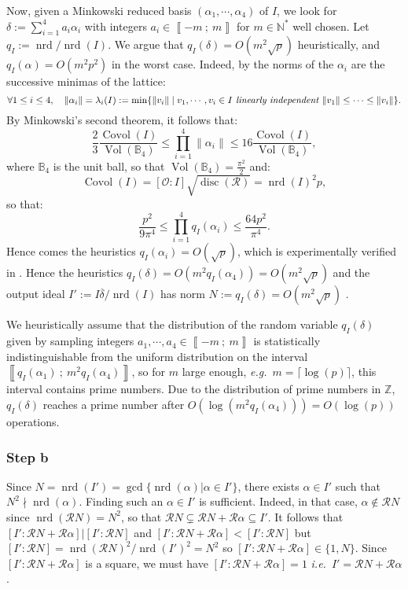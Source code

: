 \documentclass[a4paper,10pt]{report}
\theoremstyle{definition}
\theoremstyle{plain}
\theoremstyle{definition}
\newcommand{\ie}{\emph{i.e.}\ }
\newcommand{\eg}{\emph{e.g.}\ }
\newcommand{\N}{\mathbb{N}}
\newcommand{\Z}{\mathbb{Z}}
\newcommand{\B}{\mathbb{B}}
\newcommand{\m}[1]{\mathcal{#1}}
\newcommand{\mO}{\mathcal{O}}
\renewcommand{\i}[2]{\left\llbracket #1~;~#2\right\rrbracket}
\renewcommand{\(}{\left(}
\renewcommand{\)}{\right)}
\DeclareMathOperator{\disc}{disc}
\DeclareMathOperator{\nrd}{nrd}
\DeclareMathOperator{\Vol}{Vol}
\DeclareMathOperator{\Covol}{Covol}
\begin{document}
Now, given a Minkowski reduced basis $(\alpha_1, \cdots, \alpha_4)$ of $I$, we look for $\delta:=\sum_{i=1}^4 a_i\alpha_i$ with integers $a_i\in\i{-m}{m}$ for $m\in\N^*$ well chosen.  Let $q_I:=\nrd/\nrd(I)$. We argue that $q_I(\delta)=O(m^2\sqrt{p})$ heuristically, and $q_I(\alpha)=O(m^2p^2)$ in the worst case.  Indeed, by \cite[Teil I.  § 7]{VDW}
the norms of the $\alpha_i$ are the successive minimas of the lattice:
\[\forall 1\leq i\leq 4, \quad \|\alpha_i\|=\lambda_i(I):=\min\{\|v_i\|\mid v_1, \cdots, v_i\in I \emph{ linearly independent } \|v_1\|\leq\cdots\leq\|v_i\|\}.\]
By Minkowski's second theorem, it follows that:
\[\frac{2}{3}\frac{\Covol(I)}{\Vol(\B_4)}\leq \prod_{i=1}^4\|\alpha_i\|\leq 16\frac{\Covol(I)}{\Vol(\B_4)},\]
where $\B_4$ is the unit ball, so that $\Vol(\B_4)=\frac{\pi^2}{2}$ and:
\[\Covol(I)=[\mO:I]\sqrt{\disc(\m{R})}=\nrd(I)^2p,\]
so that:
\[\frac{p^2}{9\pi^4}\leq \prod_{i=1}^4q_I(\alpha_i)\leq \frac{64p^2}{\pi^4}.\]
Hence comes the heuristics $q_I(\alpha_i)=O(\sqrt{p})$, which is experimentally verified in \cite{KLPT}. Hence the heuristics $q_I(\delta)=O(m^2q_I(\alpha_4))=O(m^2\sqrt{p})$ and the output ideal $I':=I\overline{\delta}/\nrd(I)$ has norm $N:=q_I(\delta)=O(m^2\sqrt{p})$ .


We heuristically assume that the distribution of the random variable $q_I(\delta)$ given by sampling integers $a_1,\cdots,a_4\in\i{-m}{m}$ is statistically indistinguishable from the uniform distribution on the interval $\i{q_I(\alpha_1)}{m^2 q_I(\alpha_4)}$, so for $m$ large enough, \eg $m=\lceil \log(p)\rceil$, this interval contains prime numbers. Due to the distribution of prime numbers in $\Z$, $q_I(\delta)$ reaches a prime number after $O(\log(m^2 q_I(\alpha_4)))=O(\log(p))$ operations. 

\subsubsection{Step b}

Since $N=\nrd(I')=\gcd\{\nrd(\alpha)|\alpha\in I'\}$, there exists $\alpha\in I'$ such that $N^2\nmid\nrd(\alpha)$. Finding such an $\alpha\in I'$ is sufficient. Indeed, in that case, $\alpha\not\in \m{R}N$ since $\nrd(\m{R}N)=N^2$, so that $\m{R}N\subsetneq \m{R}N+\m{R}\alpha\subseteq I'$. It follows that $[I':\m{R}N+\m{R}\alpha]|[I':\m{R}N]$ and $[I':\m{R}N+\m{R}\alpha]<[I':\m{R}N]$ but $[I':\m{R}N]=\nrd(\m{R}N)^2/\nrd(I')^2=N^2$ so $[I':\m{R}N+\m{R}\alpha]\in \{1,N\}$. Since $[I':\m{R}N+\m{R}\alpha]$ is a square, we must have $[I':\m{R}N+\m{R}\alpha]=1$ \ie $I'=\m{R}N+\m{R}\alpha$.
\end{document}
